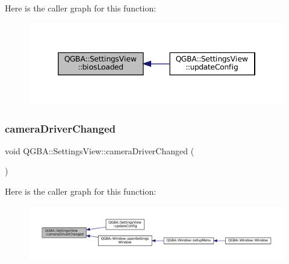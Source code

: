 Here is the caller graph for this function\+:
\nopagebreak
\begin{figure}[H]
\begin{center}
\leavevmode
\includegraphics[width=346pt]{class_q_g_b_a_1_1_settings_view_a970e1868f2c564fd80b5bc4b9364b208_icgraph}
\end{center}
\end{figure}
\mbox{\label{class_q_g_b_a_1_1_settings_view_a0d61f9caab6f460d7df59589bfb9e711}} 
\subsubsection{\texorpdfstring{camera\+Driver\+Changed}{cameraDriverChanged}}
{\footnotesize\ttfamily void Q\+G\+B\+A\+::\+Settings\+View\+::camera\+Driver\+Changed (\begin{DoxyParamCaption}{ }\end{DoxyParamCaption})\hspace{0.3cm}{\ttfamily [signal]}}

Here is the caller graph for this function\+:
\nopagebreak
\begin{figure}[H]
\begin{center}
\leavevmode
\includegraphics[width=350pt]{class_q_g_b_a_1_1_settings_view_a0d61f9caab6f460d7df59589bfb9e711_icgraph}
\end{center}
\end{figure}
\mbox{\label{class_q_g_b_a_1_1_settings_view_a64badcb415f4f6b3e7d722aba2f43b3e}} 
